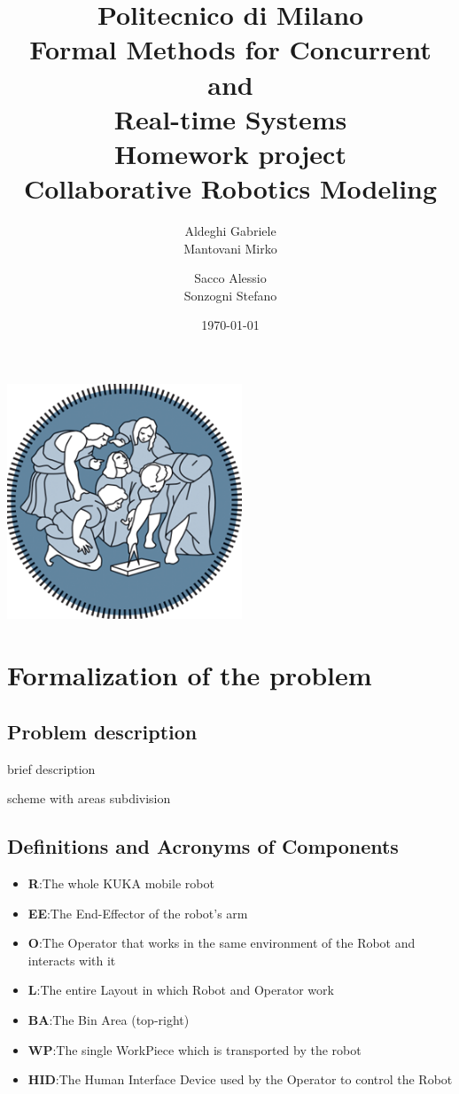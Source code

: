 \documentclass[a4paper]{article}
\title{Politecnico di Milano\\
Formal Methods for Concurrent \\
and \\
Real-time Systems\\
Homework project\\
\textbf{Collaborative Robotics Modeling }}
\author{Aldeghi Gabriele \\
  Mantovani Mirko \and
  Sacco Alessio \\
  Sonzogni Stefano}
\date{\today}
\begin{document}
\maketitle
\begin{center}
	\includegraphics[width=7cm]{images/polimi-logo}
\end{center}
\clearpage
{\hypersetup{hidelinks}\tableofcontents}
\clearpage

\section{Formalization of the problem}
\subsection{Problem description}
brief description

scheme with areas subdivision
\subsection{Definitions and Acronyms of Components}
\begin{itemize}
	\item \textbf{R}:\@ The whole KUKA mobile robot
	\item \textbf{EE}:\@ The End-Effector of the robot's arm
	\item \textbf{O}:\@ The Operator that works in the same environment of the Robot and interacts with it
	\item \textbf{L}:\@ The entire Layout in which Robot and Operator work
	\item \textbf{BA}:\@ The Bin Area (top-right)
	\item \textbf{WP}:\@ The single WorkPiece which is transported by the robot
	\item \textbf{HID}:\@ The Human Interface Device used by the Operator to control the Robot
\end{itemize}
\end{document}
